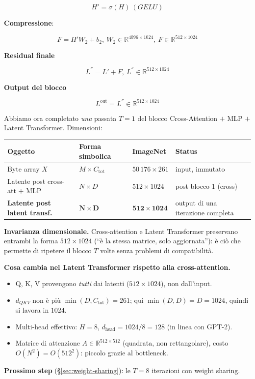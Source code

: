 \documentclass[
  11pt,
]{article}
\begin{document}
\[H' = \sigma(H)\ (GELU)\]

\textbf{Compressione}:

\[F = H'W_{2} + b_{2},\ W_{2} \in \mathbb{R}^{4096 \times 1024},\ F \in \mathbb{R}^{512 \times 1024}\]

\textbf{Residual finale}

\[L^{''} = L' + F,\ L^{''} \in \mathbb{R}^{512 \times 1024}\]

\textbf{Output del blocco}

\[L^{\text{out}} = L^{''} \in \mathbb{R}^{512 \times 1024}\]

\begin{notabox}[title={\textbf{Checkpoint dimensioni --- fine \S1.4.10 (una iterazione completa)}}]
Abbiamo ora completato \emph{una} passata $T=1$ del blocco Cross-Attention $+$ MLP $+$ Latent Transformer. Dimensioni:

\medskip
\begin{center}
\begin{tabular}{@{}llll@{}}
\toprule
\textbf{Oggetto} & \textbf{Forma simbolica} & \textbf{ImageNet} & \textbf{Status} \\
\midrule
Byte array $X$ & $M \times C_{\text{tot}}$ & $50\,176 \times 261$ & input, immutato \\
Latente post cross-att $+$ MLP & $N \times D$ & $512 \times 1024$ & post blocco 1 (cross) \\
\textbf{Latente post latent transf.} & $\boldsymbol{N \times D}$ & $\mathbf{512 \times 1024}$ & output di una iterazione completa \\
\bottomrule
\end{tabular}
\end{center}

\medskip
\textbf{Invarianza dimensionale.} Cross-attention e Latent Transformer preservano entrambi la forma $512 \times 1024$ (``è la stessa matrice, solo aggiornata''): è ciò che permette di ripetere il blocco $T$ volte senza problemi di compatibilità.

\medskip
\textbf{Cosa cambia nel Latent Transformer rispetto alla cross-attention.}
\begin{itemize}\setlength\itemsep{0.1em}
\item Q, K, V provengono \emph{tutti} dai latenti ($512 \times 1024$), non dall'input.
\item $d_{QKV}$ non è più $\min(D, C_{\text{tot}}) = 261$; qui $\min(D, D) = D = 1024$, quindi si lavora in $1024$.
\item Multi-head effettivo: $H = 8$, $d_{\text{head}} = 1024/8 = 128$ (in linea con GPT-2).
\item Matrice di attenzione $A \in \mathbb{R}^{512 \times 512}$ (quadrata, non rettangolare), costo $O(N^2) = O(512^2)$: piccolo grazie al bottleneck.
\end{itemize}

\medskip
\textbf{Prossimo step} (\S\ref{sec:weight-sharing}): le $T = 8$ iterazioni con weight sharing.
\end{notabox}
\end{document}
